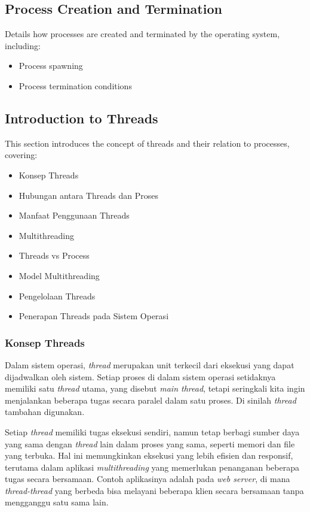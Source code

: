 \documentclass[12pt]{article}
\begin{document}
\subsection{Process Creation and Termination}
Details how processes are created and terminated by the operating system, including:
\begin{itemize}
    \item Process spawning
    \item Process termination conditions
\end{itemize}

\subsection{Introduction to Threads}
This section introduces the concept of threads and their relation to processes, covering:
\begin{itemize}
    \item Konsep Threads
    \item Hubungan antara Threads dan Proses
    \item Manfaat Penggunaan Threads
    \item Multithreading
    \item Threads vs Process
    \item Model Multithreading
    \item Pengelolaan Threads
    \item Penerapan Threads pada Sistem Operasi
\end{itemize}
\subsubsection{Konsep Threads}
Dalam sistem operasi, \textit{thread} merupakan unit terkecil dari eksekusi yang dapat dijadwalkan oleh sistem. Setiap proses di dalam sistem operasi setidaknya memiliki satu \textit{thread} utama, yang disebut \textit{main thread}, tetapi seringkali kita ingin menjalankan beberapa tugas secara paralel dalam satu proses. Di sinilah \textit{thread} tambahan digunakan.

Setiap \textit{thread} memiliki tugas eksekusi sendiri, namun tetap berbagi sumber daya yang sama dengan \textit{thread} lain dalam proses yang sama, seperti memori dan file yang terbuka. Hal ini memungkinkan eksekusi yang lebih efisien dan responsif, terutama dalam aplikasi \textit{multithreading} yang memerlukan penanganan beberapa tugas secara bersamaan. Contoh aplikasinya adalah pada \textit{web server}, di mana \textit{thread-thread} yang berbeda bisa melayani beberapa klien secara bersamaan tanpa mengganggu satu sama lain.
\end{document}
